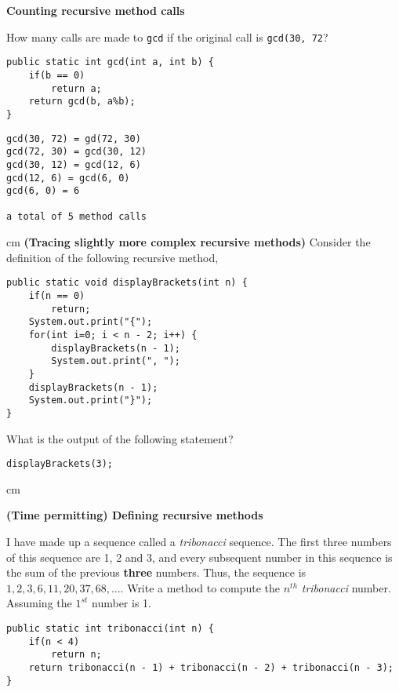 \begin{questions}
\question  \textbf{Counting recursive method calls} \vskip 0.5cm

How many calls are made to \texttt{gcd} if the original call is \texttt{gcd(30, 72}?

\begin{lstlisting}
public static int gcd(int a, int b) {
	if(b == 0)
		return a;
	return gcd(b, a%b);
}
\end{lstlisting}

\begin{solution}
\begin{verbatim}
gcd(30, 72) = gd(72, 30)
gcd(72, 30) = gcd(30, 12)
gcd(30, 12) = gcd(12, 6)
gcd(12, 6) = gcd(6, 0)
gcd(6, 0) = 6

a total of 5 method calls
\end{verbatim}
\end{solution}

\newpage

 cm \question  \textbf{(Tracing slightly more complex recursive methods)} \vskip 0.5cm
Consider the definition of the following recursive method,

\begin{lstlisting}
public static void displayBrackets(int n) {
	if(n == 0)
		return;
	System.out.print("{");
	for(int i=0; i < n - 2; i++) {
		displayBrackets(n - 1);
		System.out.print(", ");
	}
	displayBrackets(n - 1);
	System.out.print("}");	
}
\end{lstlisting}

What is the output of the following statement?

\begin{lstlisting}	
displayBrackets(3);
\end{lstlisting}
	
 cm

\question  \textbf{(Time permitting) Defining recursive methods} \vskip 0.5cm

I have made up a sequence called a \emph{tribonacci} sequence. 
The first three numbers of this sequence are 1, 2 and 3, and every subsequent number in this sequence is the sum of the previous \textbf{three} numbers. Thus, the sequence is $1, 2, 3, 6, 11, 20, 37, 68, ...$. Write a method to compute the $n^{th}$ \emph{tribonacci} number. Assuming the $1^{st}$ number is 1.

\begin{solution}
\begin{lstlisting}
public static int tribonacci(int n) {
	if(n < 4)
		return n;
	return tribonacci(n - 1) + tribonacci(n - 2) + tribonacci(n - 3);
}
\end{lstlisting}	
\end{solution}


\end{questions}
